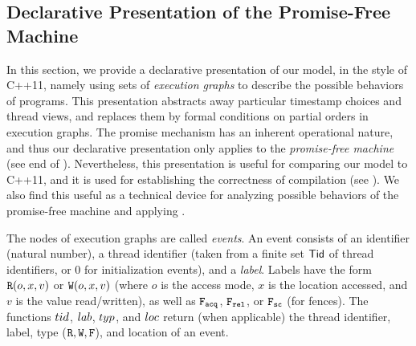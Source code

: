 \subsection{Declarative Presentation of the Promise-Free Machine}
\label{sec:axiomatic}

In this section, we provide a declarative presentation of our model, 
in the style of C++11, namely using sets of \emph{execution graphs} to describe the possible behaviors of programs.
This presentation abstracts away particular timestamp choices and thread views, 
and replaces them by formal conditions on partial orders in execution graphs.
The promise mechanism has an inherent operational nature, 
and thus our declarative presentation only applies to
the \emph{promise-free machine} (see end of ).
Nevertheless, this presentation is useful for comparing our model to C++11, 
and it is used for establishing the correctness of compilation (see ). 
We also find this useful as a technical device for analyzing
possible behaviors of the promise-free machine and applying .

The nodes of execution graphs are called \emph{events}.
%
An {event} consists of
an identifier (natural number), 
a thread identifier (taken from a finite set ${\mathsf{Tid}}$ of thread identifiers,
or $0$ for initialization events), 
and a \emph{label}.
Labels have the form
${\texttt{R}}(o,x,v)$ or ${\texttt{W}}(o,x,v)$ 
(where $o$ is the access mode, 
$x$ is the location accessed, and
$v$ is the value read/written),
as well as $\texttt{F}_{\texttt{acq}}$, $\texttt{F}_{\texttt{rel}}$, or $\texttt{F}_{\texttt{sc}}$
(for fences).
The functions ${tid}$, ${lab}$, ${typ}$, and ${loc}$
return (when applicable) the thread identifier, 
label, type ($\texttt{R},\texttt{W},\texttt{F}$), and location of an event.

